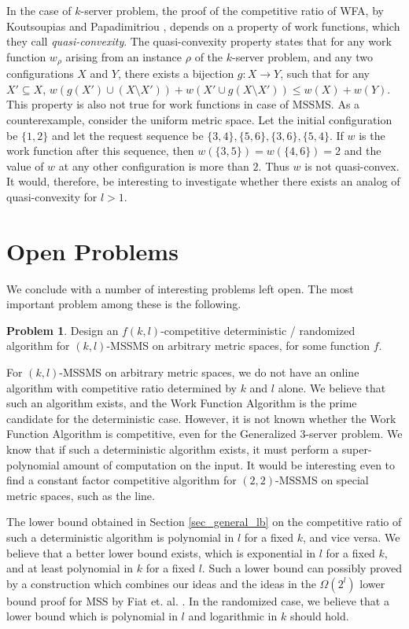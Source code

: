 \documentclass[11pt]{article}
\theoremstyle{plain}\newtheorem{theorem}{Theorem}
\theoremstyle{definition}
\newtheorem{problem}{Problem}
\theoremstyle{remark}
\begin{document}
In the case of $k$-server problem, the proof of the competitive ratio of WFA, by Koutsoupias and Papadimitriou \cite{KoutsoupiasP95}, depends on a property of work functions, which they call \textit{quasi-convexity}. The quasi-convexity property states that for any work function $w_{\rho}$ arising from an instance $\rho$ of the $k$-server problem, and any two configurations $X$ and $Y$, there exists a bijection $g:X\longrightarrow Y$, such that for any $X'\subseteq X$, $w(g(X')\cup(X\setminus X'))+w(X'\cup g(X\setminus X'))\leq w(X)+w(Y)$. This property is also not true for work functions in case of MSSMS. As a counterexample, consider the uniform metric space. Let the initial configuration be $\{1,2\}$ and let the request sequence be $\{3,4\},\{5,6\},\{3,6\},\{5,4\}$. If $w$ is the work function after this sequence, then $w(\{3,5\})=w(\{4,6\})=2$ and the value of $w$ at any other configuration is more than $2$. Thus $w$ is not quasi-convex. It would, therefore, be interesting to investigate whether there exists an analog of quasi-convexity for $l>1$.

\section{Open Problems}\label{sec_open_problems}

We conclude with a number of interesting problems left open. The most important problem among these is the following.
\begin{problem}
Design an $f(k,l)$-competitive deterministic / randomized algorithm for $(k,l)$-MSSMS on arbitrary metric spaces, for some function $f$.
\end{problem}

For $(k,l)$-MSSMS on arbitrary metric spaces, we do not have an online algorithm with competitive ratio determined by $k$ and $l$ alone. We believe that such an algorithm exists, and the Work Function Algorithm is the prime candidate for the deterministic case. However, it is not known whether the Work Function Algorithm is competitive, even for the Generalized $3$-server problem. We know that if such a deterministic algorithm exists, it must perform a super-polynomial amount of computation on the input. It would be interesting even to find a constant factor competitive algorithm for $(2,2)$-MSSMS on special metric spaces, such as the line.

The lower bound obtained in Section \ref{sec_general_lb} on the competitive ratio of such a deterministic algorithm is polynomial in $l$ for a fixed $k$, and vice versa. We believe that a better lower bound exists, which is exponential in $l$ for a fixed $k$, and at least polynomial in $k$ for a fixed $l$. Such a lower bound can possibly proved by a construction which combines our ideas and the ideas in the $\Omega(2^l)$ lower bound proof for MSS by Fiat et. al. \cite{FiatFKRRV98}. In the randomized case, we believe that a lower bound which is polynomial in $l$ and logarithmic in $k$ should hold.
\end{document}

